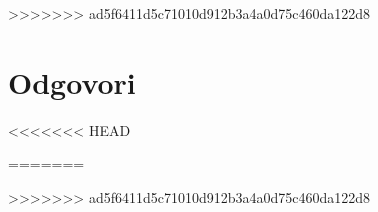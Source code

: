 
>>>>>>> ad5f6411d5c71010d912b3a4a0d75c460da122d8




\section{Odgovori}
\label{sec:polinomi-odgovori}

<<<<<<< HEAD




=======

>>>>>>> ad5f6411d5c71010d912b3a4a0d75c460da122d8




